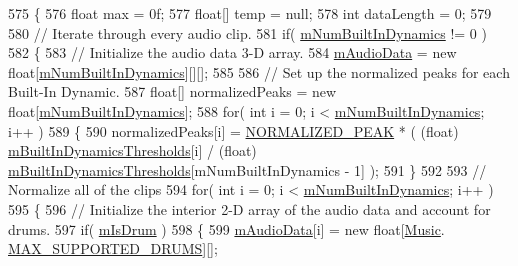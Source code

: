 \begin{DoxyCode}
575     \{
576         \textcolor{keywordtype}{float} max = 0f;
577         \textcolor{keywordtype}{float}[] temp = null;
578         \textcolor{keywordtype}{int} dataLength = 0;
579 
580         \textcolor{comment}{// Iterate through every audio clip.}
581         \textcolor{keywordflow}{if}( \hyperlink{group___v_i_base_pro_var_gac265f64f759d267ee1e1680f8d387011}{mNumBuiltInDynamics} != 0 )
582         \{
583             \textcolor{comment}{// Initialize the audio data 3-D array.}
584             \hyperlink{group___v_i_base_pro_var_ga52e76d9b74408660584676035a92a2c6}{mAudioData} = \textcolor{keyword}{new} \textcolor{keywordtype}{float}[\hyperlink{group___v_i_base_pro_var_gac265f64f759d267ee1e1680f8d387011}{mNumBuiltInDynamics}][][];
585 
586             \textcolor{comment}{// Set up the normalized peaks for each Built-In Dynamic.}
587             \textcolor{keywordtype}{float}[] normalizedPeaks = \textcolor{keyword}{new} \textcolor{keywordtype}{float}[\hyperlink{group___v_i_base_pro_var_gac265f64f759d267ee1e1680f8d387011}{mNumBuiltInDynamics}];
588             \textcolor{keywordflow}{for}( \textcolor{keywordtype}{int} i = 0; i < \hyperlink{group___v_i_base_pro_var_gac265f64f759d267ee1e1680f8d387011}{mNumBuiltInDynamics}; i++ )
589             \{
590                 normalizedPeaks[i] = \hyperlink{group___v_i_base_const_gaf060c000443f92784bd8db8d866d8b2a}{NORMALIZED\_PEAK} * ( (float)
      \hyperlink{group___v_i_base_pro_var_gae3db4264dc2a96e99ea680c6d637e6bf}{mBuiltInDynamicsThresholds}[i] / (\textcolor{keywordtype}{float})
      \hyperlink{group___v_i_base_pro_var_gae3db4264dc2a96e99ea680c6d637e6bf}{mBuiltInDynamicsThresholds}[mNumBuiltInDynamics - 1] );
591             \}
592 
593             \textcolor{comment}{// Normalize all of the clips}
594             \textcolor{keywordflow}{for}( \textcolor{keywordtype}{int} i = 0; i < \hyperlink{group___v_i_base_pro_var_gac265f64f759d267ee1e1680f8d387011}{mNumBuiltInDynamics}; i++ )
595             \{
596                 \textcolor{comment}{// Initialize the interior 2-D array of the audio data and account for drums.}
597                 \textcolor{keywordflow}{if}( \hyperlink{group___v_i_base_pro_var_ga47dbd8aa02ab32b8f802adfd2d3d81de}{mIsDrum} )
598                 \{
599                     \hyperlink{group___v_i_base_pro_var_ga52e76d9b74408660584676035a92a2c6}{mAudioData}[i] = \textcolor{keyword}{new} \textcolor{keywordtype}{float}[\hyperlink{class_music}{Music}.
      \hyperlink{group___music_constants_gabce1a1ac5b9b6355af6bd7fb3868467a}{MAX\_SUPPORTED\_DRUMS}][];

\end{DoxyCode}
